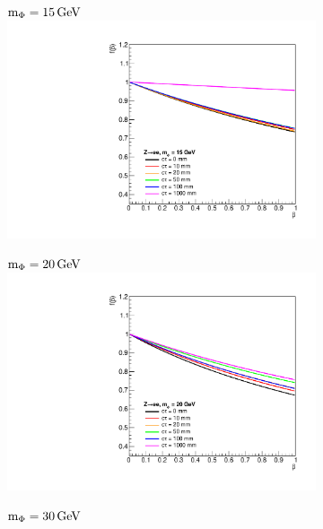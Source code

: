 \begin{figure}[htb!]
	\centering
	\captionsetup[subfigure]{justification=centering}
	\begin{subfigure}{0.3\linewidth}
		\centering
		$\text{m}_\Phi=15\,\text{Ge\hspace{-.08em}V}$
		\includegraphics[width=\linewidth]{figs/05_analysis/BR_Z_ELE_15.pdf}
	\end{subfigure}
	\begin{subfigure}{0.3\linewidth}
		\centering
		$\text{m}_\Phi=20\,\text{Ge\hspace{-.08em}V}$
		\includegraphics[width=\linewidth]{figs/05_analysis/BR_Z_ELE_20.pdf}
	\end{subfigure}
	\begin{subfigure}{0.3\linewidth}
		\centering
		$\text{m}_\Phi=30\,\text{Ge\hspace{-.08em}V}$

\end{subfigure}
\end{figure}
